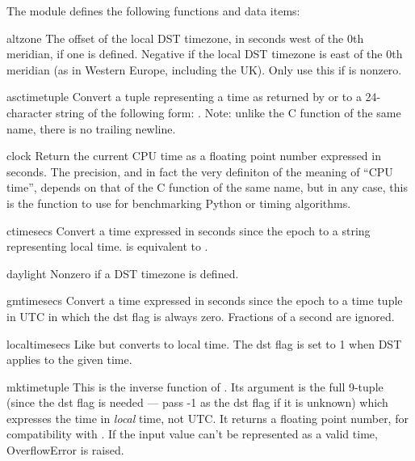 The module defines the following functions and data items:


\begin{datadesc}{altzone}
The offset of the local DST timezone, in seconds west of the 0th
meridian, if one is defined.  Negative if the local DST timezone is
east of the 0th meridian (as in Western Europe, including the UK).
Only use this if  is nonzero.
\end{datadesc}

\begin{funcdesc}{asctime}{tuple}
Convert a tuple representing a time as returned by  or
 to a 24-character string of the following form:
.  Note: unlike the C function of
the same name, there is no trailing newline.
\end{funcdesc}

\begin{funcdesc}{clock}{}
Return the current CPU time as a floating point number expressed in
seconds.  The precision, and in fact the very definiton of the meaning
of ``CPU time'', depends on that of the C function of the same name,
but in any case, this is the function to use for benchmarking Python
or timing algorithms.
\end{funcdesc}

\begin{funcdesc}{ctime}{secs}
Convert a time expressed in seconds since the epoch to a string
representing local time.   is equivalent to
.
\end{funcdesc}

\begin{datadesc}{daylight}
Nonzero if a DST timezone is defined.
\end{datadesc}

\begin{funcdesc}{gmtime}{secs}
Convert a time expressed in seconds since the epoch to a time tuple
in UTC in which the dst flag is always zero.  Fractions of a second are
ignored.
\end{funcdesc}

\begin{funcdesc}{localtime}{secs}
Like  but converts to local time.  The dst flag is set
to 1 when DST applies to the given time.
\end{funcdesc}

\begin{funcdesc}{mktime}{tuple}
This is the inverse function of .  Its argument is the
full 9-tuple (since the dst flag is needed --- pass -1 as the dst flag if
it is unknown) which expresses the time
in \emph{local} time, not UTC.  It returns a floating
point number, for compatibility with .  If the input
value can't be represented as a valid time, OverflowError is raised.
\end{funcdesc}

